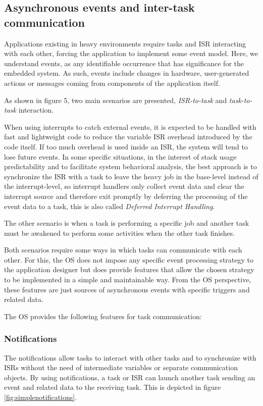 \subsection{Asynchronous events and inter-task communication}
Applications existing in heavy environments require tasks and ISR interacting with each other, forcing the application to implement some event model.
Here, we understand events, as any identifiable occurrence that has significance for the embedded system. As such, events include changes in hardware, user-generated actions or messages coming from components of the application itself.



As shown in figure 5, two main scenarios are presented, \textit{ISR-to-task} and \textit{task-to-task} interaction.  

When using interrupts to catch external events, it is expected to be handled with fast and lightweight code to reduce the variable ISR overhead introduced by the code itself. If too much overhead is used inside an ISR, the system will tend to lose future events. In some specific situations,  in the interest of stack usage predictability and to facilitate system behavioral analysis, the best approach is to synchronize the ISR with a task to leave the heavy job in the base-level instead of the interrupt-level,  so interrupt handlers only collect event data and clear the interrupt source and therefore exit promptly by deferring the processing of the event data to a task, this is also called  \textit{Deferred Interrupt Handling}. 

The other scenario is when a task is performing a specific job and another task must be awakened to perform some activities when the other task finishes.
\medskip

Both scenarios require some ways in which tasks can communicate with each other.
For this, the OS does not impose any specific event processing strategy to the application designer but does provide features that allow the chosen strategy to be implemented in a simple and maintainable way. From the OS perspective, these features are just sources of asynchronous events with specific triggers and related data. 
\medskip

The OS provides the following features for task communication:

\subsubsection{Notifications} \label{osnotifications}
The notifications allow tasks to interact with other tasks and to synchronize with ISRs without the need of intermediate variables or separate communication objects. By using notifications, a task or ISR can launch another task sending an event and related data to the receiving task.  This is depicted in figure \ref{fig:simplenotifications}.

